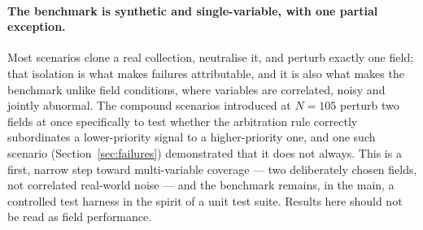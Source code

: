 \documentclass[preprint,12pt]{elsarticle}
\begin{document}
\paragraph{The benchmark is synthetic and single-variable, with one
partial exception.} Most scenarios clone a real collection, neutralise
it, and perturb exactly one field; that isolation is what makes failures
attributable, and it is also what makes the benchmark unlike field
conditions, where variables are correlated, noisy and jointly abnormal.
The compound scenarios introduced at $N=105$ perturb two fields at once
specifically to test whether the arbitration rule correctly subordinates
a lower-priority signal to a higher-priority one, and one such scenario
(Section~\ref{sec:failures}) demonstrated that it does not always. This
is a first, narrow step toward multi-variable coverage --- two
deliberately chosen fields, not correlated real-world noise --- and the
benchmark remains, in the main, a controlled test harness in the spirit
of a unit test suite. Results here should not be read as field
performance.
\end{document}

